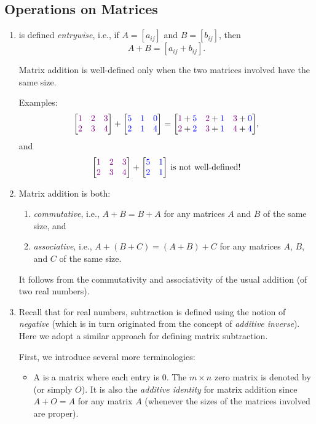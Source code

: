 \subsection{Operations on Matrices}
\label{subsect:matrix-operations}
\begin{enumerate}
\item {} is defined \emph{entrywise}, i.e., if
\(A=[a_{ij}]\) and \(B=[b_{ij}]\), then
\[
A+B=[a_{ij}+b_{ij}].
\]
\begin{note}
Matrix addition is well-defined only when the two matrices involved have the
same size.
\end{note}
Examples:
\[
\mqty[\vc{1}&\vc{2}&\vc{3}\\ \vc{2}&\vc{3}&\vc{4}]
+\mqty[\blc{5}&\blc{1}&\blc{0}\\ \blc{2}&\blc{1}&\blc{4}]
=
\mqty[\vc{1}+\blc{5}&\vc{2}+\blc{1}&\vc{3}+\blc{0}\\ \vc{2}+\blc{2}&\vc{3}+\blc{1}&\vc{4}+\blc{4}],
\]
and
\[
\mqty[\vc{1}&\vc{2}&\vc{3}\\ \vc{2}&\vc{3}&\vc{4}]
+\mqty[\blc{5}&\blc{1}\\ \blc{2}&\blc{1}]
\text{ is not well-defined!}
\]
\item \label{it:matrix-add-asso-comm}
Matrix addition is both: 
\begin{enumerate}
\item \emph{commutative}, i.e., \(A+B=B+A\) for any matrices \(A\) and \(B\) of
the same size, and
\item \emph{associative}, i.e., \(A+(B+C)=(A+B)+C\) for any matrices \(A\),
\(B\), and \(C\) of the same size.
\end{enumerate}
\begin{pf}
It follows from the commutativity and associativity of the usual addition (of
two real numbers).
\end{pf}

\item Recall that for real numbers, subtraction is defined using the notion of
\emph{negative} (which is in turn originated from the concept of \emph{additive
inverse}). Here we adopt a similar approach for defining matrix subtraction.

First, we introduce several more terminologies:
\begin{itemize}
\item A  is a matrix where each entry is \(0\). The \(m\times
n\) zero matrix is denoted by  (or simply \(O\)). It is also
the \emph{additive identity} for matrix addition since \(A+O=A\) for any matrix
\(A\) (whenever the sizes of the matrices involved are proper).


\end{itemize}
\end{enumerate}
